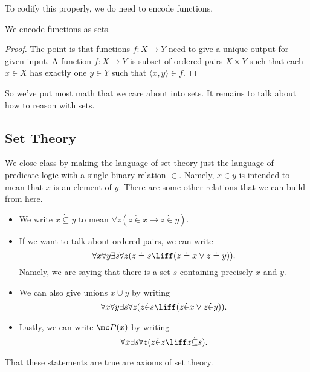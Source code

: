 To codify this properly, we do need to encode functions.
\begin{exe}
	We encode functions as sets.
\end{exe}
\begin{proof}
	The point is that functions $f\colon X\to Y$ need to give a unique output for given input. A function $f\colon X\to Y$ is subset of ordered pairs $X\times Y$ such that each $x\in X$ has exactly one $y\in Y$ such that $\langle x,y\rangle\in f$.
\end{proof}
So we've put most math that we care about into sets. It remains to talk about how to reason with sets.

\subsection{Set Theory}
We close class by making the language of set theory just the language of predicate logic with a single binary relation $\dot\in$. Namely, $x\dot\in y$ is intended to mean that $x$ is an element of $y$. There are some other relations that we can build from here.
\begin{itemize}
	\item We write $x\dot\subseteq y$ to mean $\forall z(z\dot\in x\to z\dot\in y)$.
	\item If we want to talk about ordered pairs, we can write
	\[\forall x\forall y\exists s\forall z(z\doteq s\liff(z\doteq x\lor z\doteq y)).\]
	Namely, we are saying that there is a set $s$ containing precisely $x$ and $y$.
	\item We can also give unions $x\cup y$ by writing
	\[\forall x\forall y\exists s\forall z(z\dot\in s\liff(z\dot\in x\lor z\dot\in y)).\]
	\item Lastly, we can write $\mc P(x)$ by writing
	\[\forall x\exists s\forall z(z\dot\in z\liff z\dot\subseteq s).\]
\end{itemize}
That these statements are true are axioms of set theory.